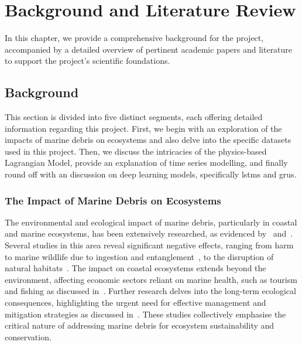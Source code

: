 \graphicspath{{content/chapters/2_background_and_literature_review/b_l_r_figures}}

\chapter{Background and Literature Review}
\label{chp:background_and_literature_review}
In this chapter, we provide a comprehensive background for the project, accompanied by a detailed overview of pertinent academic papers and literature to support the project’s scientific foundations.

\section{Background}
\label{sec:background}
This section is divided into five distinct segments, each offering detailed information regarding this project. First, we begin with an exploration of the impacts of marine debris on ecosystems and also delve into the specific datasets used in this project. Then, we discuss the intricacies of the physics-based Lagrangian Model, provide an explanation of time series modelling, and finally round off with an discussion on deep learning models, specifically \acrshort{lstm}s and \acrshort{gru}s.

\subsection{The Impact of Marine Debris on Ecosystems}
\label{subsec:2.1.1}
The environmental and ecological impact of marine debris, particularly in coastal and marine ecosystems, has been extensively researched, as evidenced by~\cite{6} and~\cite{7}. Several studies in this area reveal significant negative effects, ranging from harm to marine wildlife due to ingestion and entanglement~\cite{8}, to the disruption of natural habitats~\cite{9}. The impact on coastal ecosystems extends beyond the environment, affecting economic sectors reliant on marine health, such as tourism and fishing as discussed in~\cite{9}. Further research delves into the long-term ecological consequences, highlighting the urgent need for effective management and mitigation strategies as discussed in~\cite{10}. These studies collectively emphasise the critical nature of addressing marine debris for ecosystem sustainability and conservation. 

